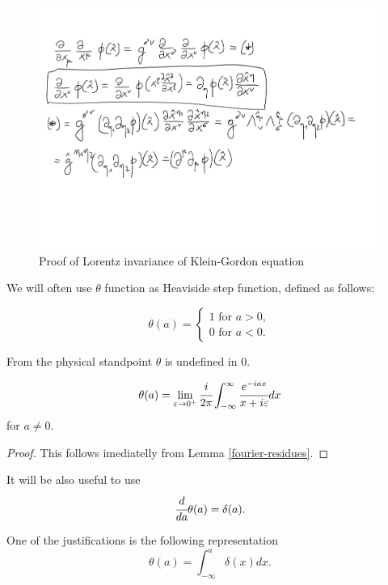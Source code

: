 \documentclass[main.tex]{subfiles}
\begin{document}
\begin{figure}[H]
\label{klein-proof}
\includegraphics[scale=0.5]{figs/KleinInvariance}
\caption{Proof of Lorentz invariance of Klein-Gordon equation}
\end{figure}


We will often use $\theta$ function as Heaviside step function, defined as follows:

\begin{equation}
\theta(a) = 
\begin{cases}
1 \text{ for } a > 0,\\
0 \text{ for } a < 0.
\end{cases}
\end{equation}

From the physical standpoint $\theta$ is undefined in $0$.

\begin{proposition}
\begin{equation}
\theta(a) = \lim\limits_{\epsilon\to 0^+} \cfrac{i}{2\pi} \int_{-\infty}^\infty  \cfrac{e^{-iax}}{x + i\epsilon} dx
\end{equation}
for $a\not=0$.
\end{proposition}
\begin{proof} This follows imediatelly from Lemma \ref{fourier-residues}.
\end{proof}

It will be also useful to use
\begin{equation}
\label{step-derivative}
\cfrac{d}{da}\theta(a) = \delta(a).
\end{equation}

One of the justifications is the following representation
\begin{equation}
\theta(a) = \int_{-\infty}^a \delta(x) dx.
\end{equation}
\end{document}
